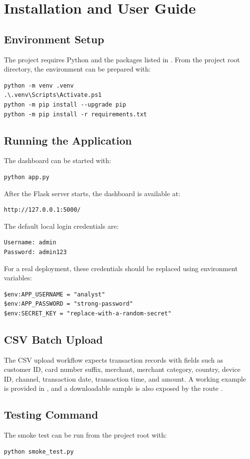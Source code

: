 \documentclass[12pt,a4paper]{report}
\begin{document}
\appendix
\chapter{Installation and User Guide}

\section{Environment Setup}
The project requires Python and the packages listed in . From the project root directory, the environment can be prepared with:
\begin{verbatim}
python -m venv .venv
.\.venv\Scripts\Activate.ps1
python -m pip install --upgrade pip
python -m pip install -r requirements.txt
\end{verbatim}

\section{Running the Application}
The dashboard can be started with:
\begin{verbatim}
python app.py
\end{verbatim}
After the Flask server starts, the dashboard is available at:
\begin{verbatim}
http://127.0.0.1:5000/
\end{verbatim}

The default local login credentials are:
\begin{verbatim}
Username: admin
Password: admin123
\end{verbatim}

For a real deployment, these credentials should be replaced using environment variables:
\begin{verbatim}
$env:APP_USERNAME = "analyst"
$env:APP_PASSWORD = "strong-password"
$env:SECRET_KEY = "replace-with-a-random-secret"
\end{verbatim}

\section{CSV Batch Upload}
The CSV upload workflow expects transaction records with fields such as customer ID, card number suffix, merchant, merchant category, country, device ID, channel, transaction date, transaction time, and amount. A working example is provided in , and a downloadable sample is also exposed by the route .

\section{Testing Command}
The smoke test can be run from the project root with:
\begin{verbatim}
python smoke_test.py
\end{verbatim}

\renewcommand{\bibname}{References}


\end{document}
